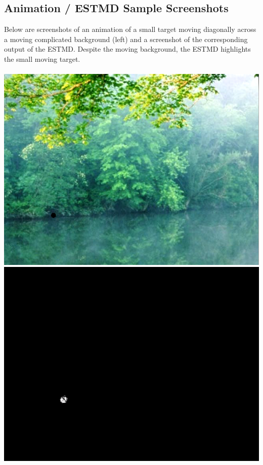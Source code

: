 \documentclass[a4paper,11pt]{article}
\begin{document}
\newpage
\begin{appendices}
\section{Animation / ESTMD Sample Screenshots}
Below are screenshots of an animation of a small target moving diagonally across a moving complicated background (left) and a screenshot of the corresponding output of the ESTMD. Despite the moving background, the ESTMD highlights the small moving target. \\ \\
\includegraphics[scale = 0.4]{input}
\includegraphics[scale = 0.5]{processed}


\end{appendices}
\end{document}
